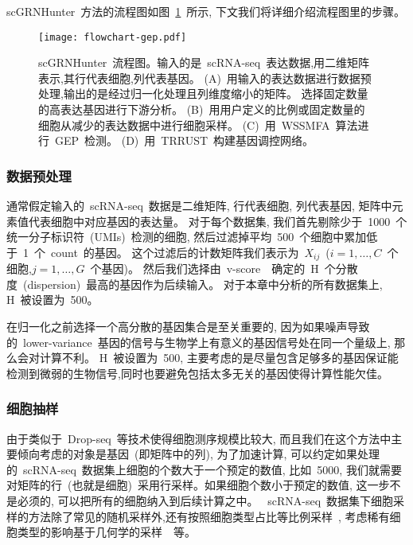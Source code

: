 scGRNHunter~方法的流程图如图~\ref{fig:gep-flowchart}~所示, 下文我们将详细介绍流程图里的步骤。
\begin{figure}[!htbp]
    \centering
    \texttt{[image: flowchart-gep.pdf]}
    \caption{
        scGRNHunter~流程图。输入的是~scRNA-seq~表达数据,用二维矩阵表示,其行代表细胞,列代表基因。
        (A)~用输入的表达数据进行数据预处理,输出的是经过归一化处理且列维度缩小的矩阵。
        选择固定数量的高表达基因进行下游分析。
        (B)~用用户定义的比例或固定数量的细胞从减少的表达数据中进行细胞采样。
        (C)~用~WSSMFA~算法进行~GEP~检测。
        (D)~用~TRRUST~构建基因调控网络。
    }
    \label{fig:gep-flowchart}
\end{figure}

\subsubsection{数据预处理}
通常假定输入的~scRNA-seq~数据是二维矩阵, 行代表细胞, 列代表基因, 矩阵中元素值代表细胞中对应基因的表达量。
对于每个数据集, 我们首先剔除少于~1000~个统一分子标识符~(UMIs)~检测的细胞,
然后过滤掉平均~500~个细胞中累加低于~1~个~count~的基因。
这个过滤后的计数矩阵我们表示为~$X_{ij}$~($i=1,\ldots,C$~个细胞,$j=1,\ldots,G$~个基因)。
然后我们选择由~v-score~\cite{klein2015droplet}~确定的~H~个分散度~(dispersion)~最高的基因作为后续输入。
对于本章中分析的所有数据集上, H~被设置为~500。

在归一化之前选择一个高分散的基因集合是至关重要的, 
因为如果噪声导致的~lower-variance~基因的信号与生物学上有意义的基因信号处在同一个量级上, 那么会对计算不利。 
H~被设置为~500, 主要考虑的是尽量包含足够多的基因保证能检测到微弱的生物信号,同时也要避免包括太多无关的基因使得计算性能欠佳。

\subsubsection{细胞抽样}
由于类似于~Drop-seq~等技术使得细胞测序规模比较大, 而且我们在这个方法中主要倾向考虑的对象是基因~(即矩阵中的列), 
为了加速计算, 可以约定如果处理的~scRNA-seq~数据集上细胞的个数大于一个预定的数值, 比如~5000,
我们就需要对矩阵的行~(也就是细胞)~采用行采样。如果细胞个数小于预定的数值, 这一步不是必须的, 可以把所有的细胞纳入到后续计算之中。
~scRNA-seq~数据集下细胞采样的方法除了常见的随机采样外,还有按照细胞类型占比等比例采样~\cite{sinha2018dropclust},
考虑稀有细胞类型的影响基于几何学的采样~\cite{hie2019geometric}~等。

